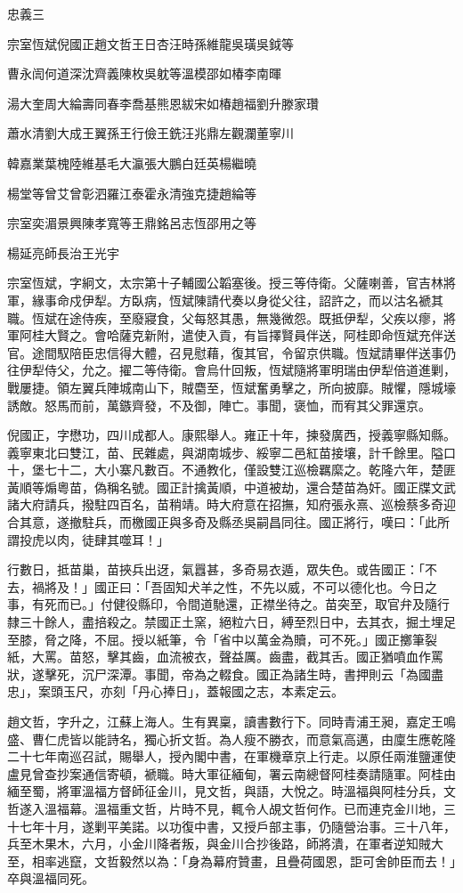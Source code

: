 
\begin{pinyinscope}
忠義三

宗室恆斌倪國正趙文哲王日杏汪時孫維龍吳璜吳鉞等

曹永訚何道深沈齊義陳枚吳躭等溫模邵如椿李南暉

湯大奎周大綸壽同春李喬基熊恩紱宋如椿趙福劉升滕家瓚

蕭水清劉大成王翼孫王行儉王銑汪兆鼎左觀瀾董寧川

韓嘉業葉槐陸維基毛大瀛張大鵬白廷英楊繼曉

楊堂等曾艾曾彰泗羅江泰霍永清強克捷趙綸等

宗室奕湄景興陳孝寬等王鼎銘呂志恆邵用之等

楊延亮師長治王光宇

宗室恆斌，字絅文，太宗第十子輔國公韜塞後。授三等侍衛。父薩喇善，官吉林將軍，緣事命戍伊犁。方臥病，恆斌陳請代奏以身從父往，詔許之，而以沽名褫其職。恆斌在途侍疾，至廢寢食，父每怒其愚，無幾微怨。既抵伊犁，父疾以瘳，將軍阿桂大賢之。會哈薩克新附，遣使入貢，有旨擇賢員伴送，阿桂即命恆斌充伴送官。途間馭陪臣忠信得大體，召見慰藉，復其官，令留京供職。恆斌請畢伴送事仍往伊犁侍父，允之。擢二等侍衛。會烏什回叛，恆斌隨將軍明瑞由伊犁倍道進剿，戰屢捷。領左翼兵陣城南山下，賊麕至，恆斌奮勇擊之，所向披靡。賊懼，隱城壕誘敵。怒馬而前，萬鏃齊發，不及御，陣亡。事聞，褒恤，而宥其父罪還京。

倪國正，字懋功，四川成都人。康熙舉人。雍正十年，揀發廣西，授義寧縣知縣。義寧東北曰雙江，苗、民雜處，與湖南城步、綏寧二邑紅苗接壤，計千餘里。隘口十，堡七十二，大小寨凡數百。不通教化，僅設雙江巡檢羈縻之。乾隆六年，楚匪黃順等煽粵苗，偽稱名號。國正計擒黃順，中道被劫，還合楚苗為奸。國正牒文武諸大府請兵，撥駐四百名，苗稍靖。時大府意在招撫，知府張永熹、巡檢蔡多奇迎合其意，遂撤駐兵，而檄國正與多奇及縣丞吳嗣昌同往。國正將行，嘆曰：「此所謂投虎以肉，徒肆其噬耳！」

行數日，抵苗巢，苗挾兵出迓，氣囂甚，多奇易衣遁，眾失色。或告國正：「不去，禍將及！」國正曰：「吾固知犬羊之性，不先以威，不可以德化也。今日之事，有死而已。」付健役縣印，令間道馳還，正襟坐待之。苗突至，取官弁及隨行隸三十餘人，盡掊殺之。禁國正土窯，絕粒六日，縛至烈日中，去其衣，掘土埋足至膝，脅之降，不屈。授以紙筆，令「省中以萬金為贖，可不死。」國正擲筆裂紙，大罵。苗怒，擊其齒，血流被衣，聲益厲。齒盡，截其舌。國正猶噴血作罵狀，遂擊死，沉尸深潭。事聞，帝為之輟食。國正為諸生時，書押則云「為國盡忠」，案頭玉尺，亦刻「丹心捧日」，蓋報國之志，本素定云。

趙文哲，字升之，江蘇上海人。生有異稟，讀書數行下。同時青浦王昶，嘉定王鳴盛、曹仁虎皆以能詩名，獨心折文哲。為人瘦不勝衣，而意氣高邁，由廩生應乾隆二十七年南巡召試，賜舉人，授內閣中書，在軍機章京上行走。以原任兩淮鹽運使盧見曾查抄案通信寄頓，褫職。時大軍征緬甸，署云南總督阿桂奏請隨軍。阿桂由緬至蜀，將軍溫福方督師征金川，見文哲，與語，大悅之。時溫福與阿桂分兵，文哲遂入溫福幕。溫福重文哲，片時不見，輒令人覘文哲何作。已而連克金川地，三十七年十月，遂剿平美諾。以功復中書，又授戶部主事，仍隨營治事。三十八年，兵至木果木，六月，小金川降者叛，與金川合抄後路，師將潰，在軍者逆知賊大至，相率逃竄，文哲毅然以為：「身為幕府贊畫，且疊荷國恩，詎可舍帥臣而去！」卒與溫福同死。


\end{pinyinscope}
